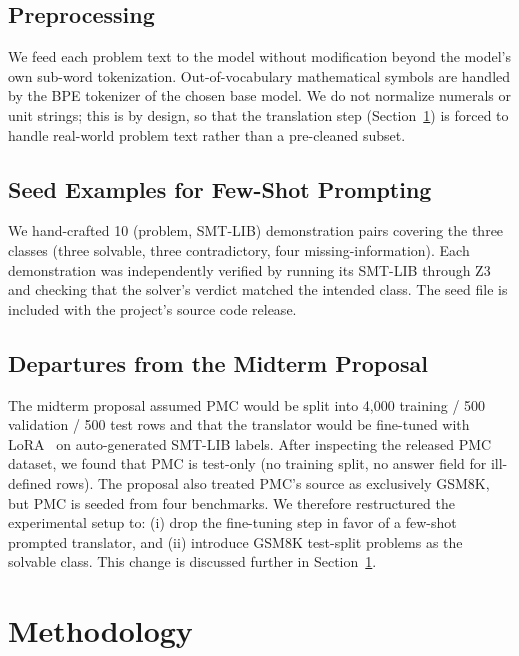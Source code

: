 \documentclass[sigconf, nonacm, onecolumn]{acmart}
\begin{document}
\subsection{Preprocessing}

We feed each problem text to the model without modification beyond the
model's own sub-word tokenization. Out-of-vocabulary mathematical symbols
are handled by the BPE tokenizer of the chosen base model. We do not
normalize numerals or unit strings; this is by design, so that the
translation step (Section~\ref{sec:method}) is forced to handle real-world
problem text rather than a pre-cleaned subset.

\subsection{Seed Examples for Few-Shot Prompting}
\label{sec:seeds}

We hand-crafted 10 (problem, SMT-LIB) demonstration pairs covering the three
classes (three solvable, three contradictory, four missing-information).
Each demonstration was independently verified by running its SMT-LIB through
Z3 and checking that the solver's verdict matched the intended class. The
seed file is included with the project's source code release.

\subsection{Departures from the Midterm Proposal}

The midterm proposal assumed PMC would be split into 4{,}000 training /
500 validation / 500 test rows and that the translator would be
fine-tuned with LoRA~\cite{hu2022} on auto-generated SMT-LIB labels. After
inspecting the released PMC dataset, we found that PMC is test-only (no
training split, no answer field for ill-defined rows). The proposal also
treated PMC's source as exclusively GSM8K, but PMC is seeded from four
benchmarks. We therefore restructured the experimental setup to: (i) drop
the fine-tuning step in favor of a few-shot prompted translator, and (ii)
introduce GSM8K test-split problems as the solvable class. This change is
discussed further in Section~\ref{sec:method}.

\section{Methodology}
\label{sec:method}
\end{document}
